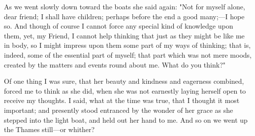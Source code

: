 As we went slowly down toward the boats she said again: "Not for myself
alone, dear friend; I shall have children; perhaps before the end a good
many;---I hope so. And though of course I cannot force any special kind
of knowledge upon them, yet, my Friend, I cannot help thinking that just
as they might be like me in body, so I might impress upon them some part
of my ways of thinking; that is, indeed, some of the essential part of
myself; that part which was not mere moods, created by the matters and
events round about me. What do you think?"

Of one thing I was sure, that her beauty and kindness and eagerness
combined, forced me to think as she did, when she was not earnestly
laying herself open to receive my thoughts. I said, what at the time was
true, that I thought it most important; and presently stood entranced by
the wonder of her grace as she stepped into the light boat, and held out
her hand to me. And so on we went up the Thames still---or whither?
